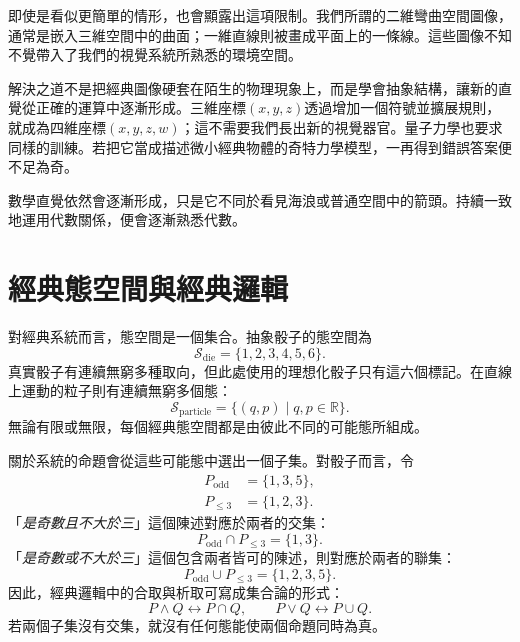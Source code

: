 即使是看似更簡單的情形，也會顯露出這項限制。我們所謂的二維彎曲空間圖像，通常是嵌入三維空間中的曲面；一維直線則被畫成平面上的一條線。這些圖像不知不覺帶入了我們的視覺系統所熟悉的環境空間。

解決之道不是把經典圖像硬套在陌生的物理現象上，而是學會抽象結構，讓新的直覺從正確的運算中逐漸形成。三維座標\((x,y,z)\)透過增加一個符號並擴展規則，就成為四維座標\((x,y,z,w)\)；這不需要我們長出新的視覺器官。量子力學也要求同樣的訓練。若把它當成描述微小經典物體的奇特力學模型，一再得到錯誤答案便不足為奇。

\begin{remark}
數學直覺依然會逐漸形成，只是它不同於看見海浪或普通空間中的箭頭。持續一致地運用代數關係，便會逐漸熟悉代數。
\end{remark}

\section{經典態空間與經典邏輯}

對經典系統而言，態空間是一個集合。抽象骰子的態空間為
\begin{equation}
  \mathcal S_{\mathrm{die}}=\{1,2,3,4,5,6\}.
\end{equation}
真實骰子有連續無窮多種取向，但此處使用的理想化骰子只有這六個標記。在直線上運動的粒子則有連續無窮多個態：
\begin{equation}
  \mathcal S_{\mathrm{particle}}
  =
  \{(q,p)\mid q,p\in\mathbb R\}.
\end{equation}
無論有限或無限，每個經典態空間都是由彼此不同的可能態所組成。

關於系統的命題會從這些可能態中選出一個子集。對骰子而言，令
\begin{align}
  P_{\mathrm{odd}}&=\{1,3,5\},\\
  P_{\leq 3}&=\{1,2,3\}.
\end{align}
「\emph{是奇數且不大於三}」這個陳述對應於兩者的交集：
\begin{equation}
  P_{\mathrm{odd}}\cap P_{\leq 3}=\{1,3\}.
\end{equation}
「\emph{是奇數或不大於三}」這個包含兩者皆可的陳述，則對應於兩者的聯集：
\begin{equation}
  P_{\mathrm{odd}}\cup P_{\leq 3}
  =
  \{1,2,3,5\}.
\end{equation}
因此，經典邏輯中的合取與析取可寫成集合論的形式：
\begin{equation}
  P\wedge Q\longleftrightarrow P\cap Q,
  \qquad
  P\vee Q\longleftrightarrow P\cup Q.
\end{equation}
若兩個子集沒有交集，就沒有任何態能使兩個命題同時為真。

